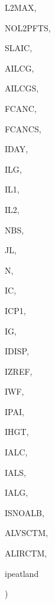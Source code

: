 {\begin{DoxyParamCaption}
\item[{integer}]{L2\+M\+A\+X, }
\item[{integer, dimension(ic)}]{N\+O\+L2\+P\+F\+T\+S, }
\item[{real, dimension(ilg,ic)}]{S\+L\+A\+I\+C, }
\item[{real, dimension (ilg,ictem)}]{A\+I\+L\+C\+G, }
\item[{real, dimension(ilg,ictem)}]{A\+I\+L\+C\+G\+S, }
\item[{real, dimension(ilg,ictem)}]{F\+C\+A\+N\+C, }
\item[{real, dimension(ilg,ictem)}]{F\+C\+A\+N\+C\+S, }
\item[{integer}]{I\+D\+A\+Y, }
\item[{integer}]{I\+L\+G, }
\item[{integer}]{I\+L1, }
\item[{integer}]{I\+L2, }
\item[{integer}]{N\+B\+S, }
\item[{integer}]{J\+L, }
\item[{integer}]{N, }
\item[{integer}]{I\+C, }
\item[{integer}]{I\+C\+P1, }
\item[{integer}]{I\+G, }
\item[{integer}]{I\+D\+I\+S\+P, }
\item[{integer}]{I\+Z\+R\+E\+F, }
\item[{integer}]{I\+W\+F, }
\item[{integer}]{I\+P\+A\+I, }
\item[{integer}]{I\+H\+G\+T, }
\item[{integer}]{I\+A\+L\+C, }
\item[{integer}]{I\+A\+L\+S, }
\item[{integer}]{I\+A\+L\+G, }
\item[{integer}]{I\+S\+N\+O\+A\+L\+B, }
\item[{real, dimension(ilg,ic)}]{A\+L\+V\+S\+C\+T\+M, }
\item[{real, dimension(ilg,ic)}]{A\+L\+I\+R\+C\+T\+M, }
\item[{integer, dimension(ilg)}]{ipeatland}
\end{DoxyParamCaption}
)}\label{CLASSA_8f_a4ba5845339f63dd223722f0e0593c72e}

